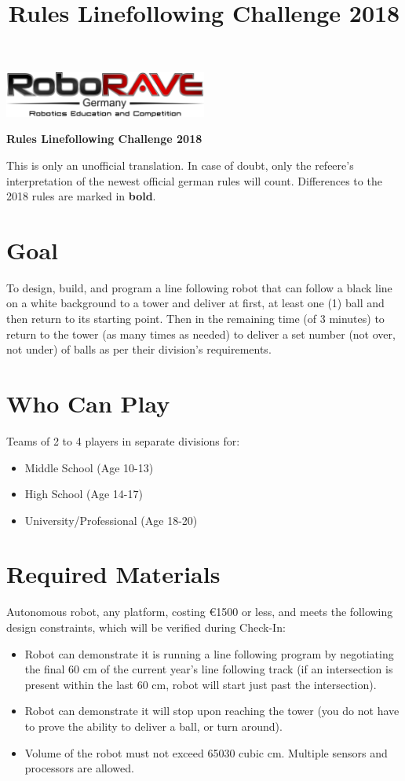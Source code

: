 \documentclass[a4paper,12pt]{article}
\begin{document}
\title{Rules Linefollowing Challenge 2018}

 \begin{center}
\includegraphics[width=0.5\textwidth]{logo.png}

\huge                      %
\bfseries                   %
Rules Linefollowing Challenge 2018
  \end{center}
  This is only an unofficial translation. In case of doubt, only the refeere's interpretation of the newest
official german rules will count. Differences to the 2018 rules are marked in \textbf{bold}.
\section{Goal}
To design, build, and program a line following robot that can follow a black line on a white
background to a tower and deliver at first, at least one (1) ball and then return to its starting
point. Then in the remaining time (of 3 minutes) to return to the tower (as many times as
needed) to deliver a set number
(not over, not under) of balls as per their division’s
requirements.
\section{Who Can Play}
Teams of 2 to 4 players in separate divisions for:
\begin{itemize}
		\item Middle School (Age 10-13)
		\item High School (Age 14-17)
		\item University/Professional (Age 18-20)
\end{itemize}
\section{Required Materials}
Autonomous robot, any platform, costing \euro{1500}  or less, and meets the following design
constraints, which will be verified during Check-In:

\begin{itemize}
	\item Robot can demonstrate it is running a line following program by negotiating the final 60 cm of
	the current year's line following track (if an intersection is present within the last 60 cm, robot
	will start just past the intersection).
	\item Robot can demonstrate it will stop upon reaching the tower (you do not have to prove the ability
	to deliver a ball, or turn around).
	\item Volume of the robot must not
	exceed 65030 cubic cm. Multiple sensors and processors are
	allowed.
\end{itemize}
\end{document}
